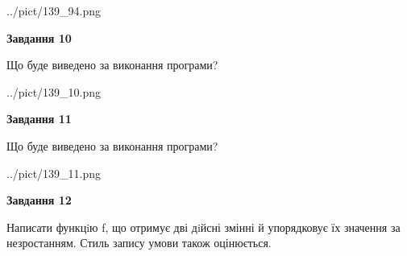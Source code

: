 \documentclass[12pt, ukrainian]{article}
\begin{document}
{\begin {large}
\begin{center}
	{../pict/139_94.png}
\end{center}
\newpage

{\begin {center}\textbf{Завдання 10}\end {center}}

Що буде виведено за виконання програми?\par
\begin{center}
	{../pict/139_10.png}
\end{center}
\newpage

{\begin {center}\textbf{Завдання 11}\end {center}}

Що буде виведено за виконання програми?\par
\begin{center}
	{../pict/139_11.png}
\end{center}
\newpage

{\begin {center}\textbf{Завдання 12}\end {center}}


Написати функцiю f, що отримує дві дiйсні змінні й упорядковує їх значення за незростанням. Стиль запису умови також оцінюється.\par
\newpage

\end {large}}
\end{document}

